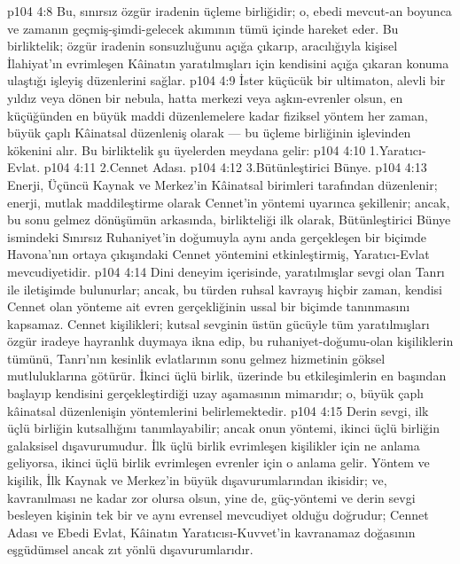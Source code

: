 \vs p104 4:8 Bu, sınırsız özgür iradenin üçleme birliğidir; o, ebedi mevcut\hyp{}an boyunca ve zamanın geçmiş\hyp{}şimdi\hyp{}gelecek akımının tümü içinde hareket eder. Bu birliktelik; özgür iradenin sonsuzluğunu açığa çıkarıp, aracılığıyla kişisel İlahiyat’ın evrimleşen Kâinatın yaratılmışları için kendisini açığa çıkaran konuma ulaştığı işleyiş düzenlerini sağlar.
\vs p104 4:9  İster küçücük bir ultimaton, alevli bir yıldız veya dönen bir nebula, hatta merkezi veya aşkın\hyp{}evrenler olsun, en küçüğünden en büyük maddi düzenlemelere kadar fiziksel yöntem her zaman, büyük çaplı Kâinatsal düzenleniş olarak --- bu üçleme birliğinin işlevinden kökenini alır. Bu birliktelik şu üyelerden meydana gelir:
\vs p104 4:10 1.\bibnobreakspace Yaratıcı\hyp{}Evlat.
\vs p104 4:11 2.\bibnobreakspace Cennet Adası.
\vs p104 4:12 3.\bibnobreakspace Bütünleştirici Bünye.
\vs p104 4:13 Enerji, Üçüncü Kaynak ve Merkez’in Kâinatsal birimleri tarafından düzenlenir; enerji, mutlak maddileştirme olarak Cennet’in yöntemi uyarınca şekillenir; ancak, bu sonu gelmez dönüşümün arkasında, birlikteliği ilk olarak, Bütünleştirici Bünye ismindeki Sınırsız Ruhaniyet’in doğumuyla aynı anda gerçekleşen bir biçimde Havona’nın ortaya çıkışındaki Cennet yöntemini etkinleştirmiş, Yaratıcı\hyp{}Evlat mevcudiyetidir.
\vs p104 4:14 Dini deneyim içerisinde, yaratılmışlar sevgi olan Tanrı ile iletişimde bulunurlar; ancak, bu türden ruhsal kavrayış hiçbir zaman, kendisi Cennet olan yönteme ait evren gerçekliğinin ussal bir biçimde tanınmasını kapsamaz. Cennet kişilikleri; kutsal sevginin üstün gücüyle tüm yaratılmışları özgür iradeye hayranlık duymaya ikna edip, bu ruhaniyet\hyp{}doğumu\hyp{}olan kişiliklerin tümünü, Tanrı’nın kesinlik evlatlarının sonu gelmez hizmetinin göksel mutluluklarına götürür. İkinci üçlü birlik, üzerinde bu etkileşimlerin en başından başlayıp kendisini gerçekleştirdiği uzay aşamasının mimarıdır; o, büyük çaplı kâinatsal düzenlenişin yöntemlerini belirlemektedir.
\vs p104 4:15 Derin sevgi, ilk üçlü birliğin kutsallığını tanımlayabilir; ancak onun yöntemi, ikinci üçlü birliğin galaksisel dışavurumudur. İlk üçlü birlik evrimleşen kişilikler için ne anlama geliyorsa, ikinci üçlü birlik evrimleşen evrenler için o anlama gelir. Yöntem ve kişilik, İlk Kaynak ve Merkez’in büyük dışavurumlarından ikisidir; ve, kavranılması ne kadar zor olursa olsun, yine de, güç\hyp{}yöntemi ve derin sevgi besleyen kişinin tek bir ve aynı evrensel mevcudiyet olduğu doğrudur; Cennet Adası ve Ebedi Evlat, Kâinatın Yaratıcısı\hyp{}Kuvvet’in kavranamaz doğasının eşgüdümsel ancak zıt yönlü dışavurumlarıdır.
